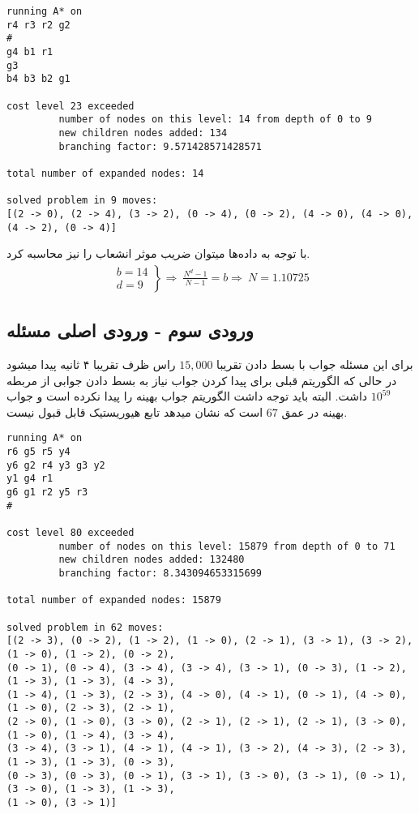 \documentclass{article}
\begin{document}
\begin{latin}
\begin{lstlisting}
running A* on 
r4 r3 r2 g2
#
g4 b1 r1
g3
b4 b3 b2 g1

cost level 23 exceeded
         number of nodes on this level: 14 from depth of 0 to 9
         new children nodes added: 134
         branching factor: 9.571428571428571

total number of expanded nodes: 14

solved problem in 9 moves:
[(2 -> 0), (2 -> 4), (3 -> 2), (0 -> 4), (0 -> 2), (4 -> 0), (4 -> 0), (4 -> 2), (0 -> 4)]
\end{lstlisting}
\end{latin}

با توجه به داده‌ها میتوان ضریب موثر انشعاب را نیز محاسبه کرد.
\begin{align*}
\left.\begin{array}{l}
b = 14\\
d = 9
\end{array} \right\} \Rightarrow\ \frac{N^d - 1}{N - 1} = b \Rightarrow\ N = 1.10725
\end{align*}



\newpage
\subsection*{ورودی سوم - ورودی اصلی مسئله}
برای این مسئله جواب با بسط دادن تقریبا $15,000$ راس ظرف تقریبا ۴ ثانیه پیدا میشود در حالی که الگوریتم قبلی برای پیدا کردن جواب نیاز به بسط دادن جوابی از مربطه $10^{59}$ داشت. البته باید توجه داشت الگوریتم جواب بهینه را پیدا نکرده است و جواب بهینه در عمق $67$ است که نشان میدهد تابع هیوریستیک قابل قبول نیست.
\begin{latin}
\begin{lstlisting}
running A* on
r6 g5 r5 y4
y6 g2 r4 y3 g3 y2
y1 g4 r1
g6 g1 r2 y5 r3
#

cost level 80 exceeded
         number of nodes on this level: 15879 from depth of 0 to 71
         new children nodes added: 132480
         branching factor: 8.343094653315699

total number of expanded nodes: 15879

solved problem in 62 moves:
[(2 -> 3), (0 -> 2), (1 -> 2), (1 -> 0), (2 -> 1), (3 -> 1), (3 -> 2), (1 -> 0), (1 -> 2), (0 -> 2), 
(0 -> 1), (0 -> 4), (3 -> 4), (3 -> 4), (3 -> 1), (0 -> 3), (1 -> 2), (1 -> 3), (1 -> 3), (4 -> 3), 
(1 -> 4), (1 -> 3), (2 -> 3), (4 -> 0), (4 -> 1), (0 -> 1), (4 -> 0), (1 -> 0), (2 -> 3), (2 -> 1), 
(2 -> 0), (1 -> 0), (3 -> 0), (2 -> 1), (2 -> 1), (2 -> 1), (3 -> 0), (1 -> 0), (1 -> 4), (3 -> 4), 
(3 -> 4), (3 -> 1), (4 -> 1), (4 -> 1), (3 -> 2), (4 -> 3), (2 -> 3), (1 -> 3), (1 -> 3), (0 -> 3), 
(0 -> 3), (0 -> 3), (0 -> 1), (3 -> 1), (3 -> 0), (3 -> 1), (0 -> 1), (3 -> 0), (1 -> 3), (1 -> 3), 
(1 -> 0), (3 -> 1)]
\end{lstlisting}
\end{latin}
\end{document}
